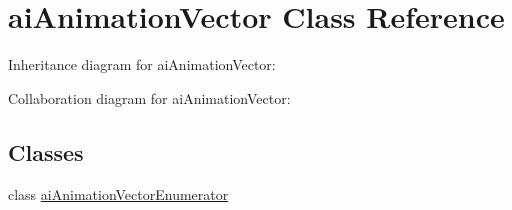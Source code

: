 \hypertarget{classai_animation_vector}{\section{ai\+Animation\+Vector Class Reference}
\label{classai_animation_vector}
}


Inheritance diagram for ai\+Animation\+Vector\+:


Collaboration diagram for ai\+Animation\+Vector\+:
\subsection*{Classes}
\begin{DoxyCompactItemize}
\item 
class \hyperlink{classai_animation_vector_1_1ai_animation_vector_enumerator}{ai\+Animation\+Vector\+Enumerator}
\end{DoxyCompactItemize}
